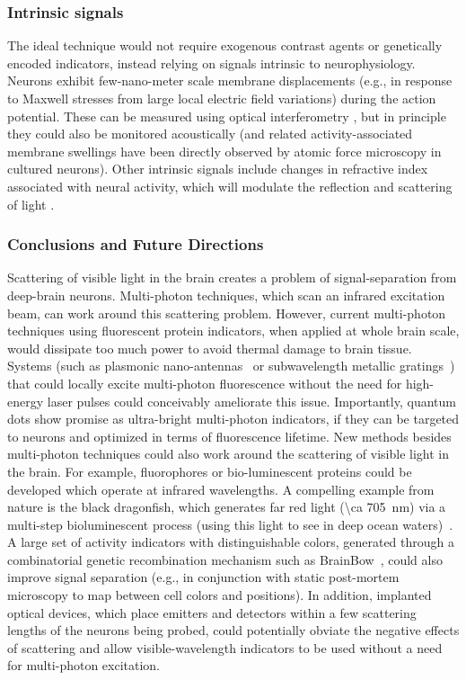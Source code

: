 \subsubsection{Intrinsic signals}

The ideal technique would not require exogenous contrast agents or genetically encoded indicators, instead relying on signals intrinsic to neurophysiology. Neurons exhibit few-nano-meter scale \cite{iwasa1980swelling} membrane displacements (e.g., in response to Maxwell stresses from large local electric field variations) during the action potential. These can be measured using optical interferometry \cite{fang2004noncontact}, but in principle they could also be monitored acoustically (and related activity-associated membrane swellings have been directly observed by atomic force microscopy \cite{kim2007mechanical} in cultured neurons). Other intrinsic signals include changes in refractive index associated with neural activity, which will modulate the reflection and scattering of light \cite{stepnoski1991noninvasive}.

\subsubsection{Conclusions and Future Directions}

Scattering of visible light in the brain creates a problem of signal-separation from deep-brain neurons.
Multi-photon techniques, which scan an infrared excitation beam, can work around this scattering problem.
However, current multi-photon techniques using fluorescent protein indicators, when applied at whole brain scale, would dissipate too much power to avoid thermal damage to brain tissue.
Systems (such as plasmonic nano-antennas~\cite{blanchard11} or subwavelength metallic gratings~\cite{Harats11}) that could locally excite multi-photon fluorescence without the need for high-energy laser pulses could conceivably ameliorate this issue. 
Importantly, quantum dots show promise as ultra-bright multi-photon indicators, if they can be targeted to neurons and optimized in terms of fluorescence lifetime.
New methods besides multi-photon techniques could also work around the scattering of visible light in the brain.
For example, fluorophores or bio-luminescent proteins could be developed which operate at infrared wavelengths.
A compelling example from nature is the black dragonfish, which generates far red light (\SI{\ca 705}{\nano\meter}) via a multi-step bioluminescent process (using this light to see in deep ocean waters)~\cite{widder84,campbell87}.
A large set of activity indicators with distinguishable colors, generated through a combinatorial genetic recombination mechanism such as BrainBow~\cite{livet07}, could also improve signal separation (e.g., in conjunction with static post-mortem microscopy to map between cell colors and positions).
In addition, implanted optical devices, which place emitters and detectors within a few scattering lengths of the neurons being probed, could potentially obviate the negative effects of scattering and allow visible-wavelength indicators to be used without a need for multi-photon excitation.

